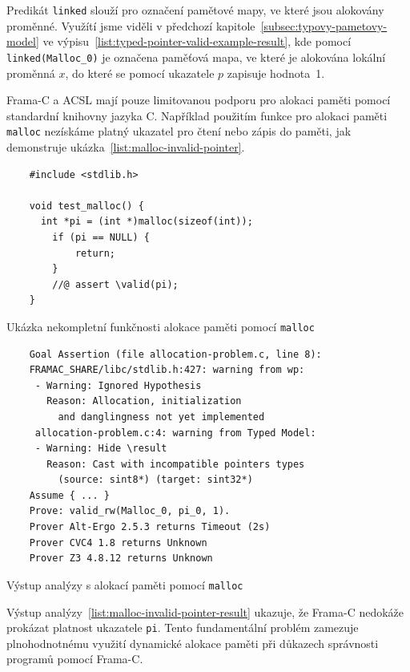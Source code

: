 Predikát \texttt{linked} slouží pro označení pamětové mapy,
ve které jsou alokovány proměnné.
Využítí jsme viděli v předchozí kapitole~\ref{subsec:typovy-pametovy-model}
ve výpisu~\ref{list:typed-pointer-valid-example-result}, kde pomocí
\texttt{linked(Malloc\_0)} je označena paměťová mapa,
ve které je alokována lokální proměnná $x$,
do které se pomocí ukazatele $p$ zapisuje hodnota~1.

Frama\mbox{-}C a ACSL mají pouze limitovanou podporu pro alokaci paměti pomocí standardní knihovny jazyka C.
Například použitím funkce pro alokaci paměti \texttt{malloc} nezískáme platný ukazatel pro čtení nebo zápis do paměti,
jak demonstruje ukázka~\ref{list:malloc-invalid-pointer}.

\begin{listing}[H]
    \begin{verbatim}
    #include <stdlib.h>

    void test_malloc() {
      int *pi = (int *)malloc(sizeof(int));
        if (pi == NULL) {
            return;
        }
        //@ assert \valid(pi);
    }
    \end{verbatim}
    \caption{Ukázka nekompletní funkčnosti alokace paměti pomocí \texttt{malloc}}
    \label{list:malloc-invalid-pointer}
\end{listing}

\begin{listing}[H]
    \begin{verbatim}
    Goal Assertion (file allocation-problem.c, line 8):
    FRAMAC_SHARE/libc/stdlib.h:427: warning from wp:
     - Warning: Ignored Hypothesis
       Reason: Allocation, initialization
         and danglingness not yet implemented
     allocation-problem.c:4: warning from Typed Model:
     - Warning: Hide \result
       Reason: Cast with incompatible pointers types
         (source: sint8*) (target: sint32*)
    Assume { ... }
    Prove: valid_rw(Malloc_0, pi_0, 1).
    Prover Alt-Ergo 2.5.3 returns Timeout (2s)
    Prover CVC4 1.8 returns Unknown
    Prover Z3 4.8.12 returns Unknown
    \end{verbatim}
    \caption{Výstup analýzy s alokací paměti pomocí \texttt{malloc}}
    \label{list:malloc-invalid-pointer-result}
\end{listing}

Výstup analýzy~\ref{list:malloc-invalid-pointer-result} ukazuje,
že Frama\mbox{-}C nedokáže prokázat platnost ukazatele \texttt{pi}.
Tento fundamentální problém zamezuje plnohodnotnému využití dynamické alokace paměti
při důkazech správnosti programů pomocí Frama\mbox{-}C\@.

